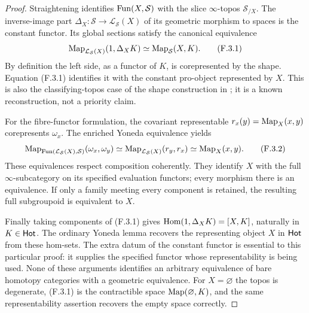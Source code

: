 \begin{proof}
Straightening identifies $\operatorname{Fun}(X,\mathcal S)$ with the slice
$\infty$-topos $\mathcal S_{/X}$.  The inverse-image part
$\Delta_X:\mathcal S\to\mathcal L_{\mathcal S}(X)$ of its
geometric morphism to spaces is the constant functor.  Its global
sections satisfy the canonical equivalence
\[
 \operatorname{Map}_{\mathcal L_{\mathcal S}(X)}(1,\Delta_XK)
                         \simeq\operatorname{Map}_{\mathcal S}(X,K).         \tag{F.3.1}
\]
By definition the left side, as a functor of $K$, is corepresented
by the shape.  Equation (F.3.1) identifies it with the constant
pro-object represented by $X$.  This is also the classifying-topos
case of the shape construction in
\citet[Section 2]{EF_Hoyois2018}; it is a known reconstruction,
not a priority claim.

For the fibre-functor formulation, the covariant representable
$r_x(y)=\operatorname{Map}_X(x,y)$ corepresents $\omega_x$.  The enriched
Yoneda equivalence yields
\[
 \operatorname{Map}_{\operatorname{Fun}(\mathcal L_{\mathcal S}(X),\mathcal S)}
       (\omega_x,\omega_y)
 \simeq\operatorname{Map}_{\mathcal L_{\mathcal S}(X)}(r_y,r_x)
 \simeq\operatorname{Map}_X(x,y).                                          \tag{F.3.2}
\]
These equivalences respect composition coherently.  They identify
$X$ with the full $\infty$-subcategory on its specified evaluation
functors; every morphism there is an equivalence.  If only a family
meeting every component is retained, the resulting full subgroupoid
is equivalent to $X$.

Finally taking components of (F.3.1) gives
$\operatorname{Hom}(1,\Delta_XK)=[X,K]$, naturally in $K\in\mathsf{Hot}$.
The ordinary Yoneda lemma recovers the representing object $X$ in
$\mathsf{Hot}$ from these hom-sets.  The extra datum of the constant
functor is essential to this particular proof: it supplies the
specified functor whose representability is being used.  None of
these arguments identifies an arbitrary equivalence of bare
homotopy categories with a geometric equivalence.  For $X=\varnothing$
the topos is degenerate, (F.3.1) is the contractible space
$\operatorname{Map}(\varnothing,K)$, and the same representability assertion
recovers the empty space correctly.
\end{proof}

